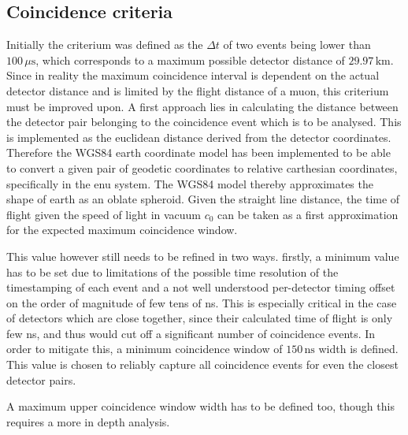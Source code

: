 \documentclass[abstract,toc,los,english,10pt,glossary,acronyms]{jluthesis}
\begin{document}
\subsection{Coincidence criteria}
\begin{figure}[ht!]
	\centering
\end{figure}
Initially the criterium was defined as the $\Delta{t}$ of two events being lower than $100\,\mu\text{s}$, which corresponds to a maximum possible detector distance of $29.97\,\text{km}$. Since in reality the maximum coincidence interval is dependent on the actual detector distance and is limited by the flight distance of a muon, this criterium must be improved upon. A first approach lies in calculating the distance between the detector pair belonging to the coincidence event which is to be analysed. This is implemented as the euclidean distance derived from the detector coordinates. Therefore the WGS84 earth coordinate model has been implemented to be able to convert a given pair of geodetic coordinates to relative carthesian coordinates, specifically in the \acrfull{enu} system. The WGS84 model thereby approximates the shape of earth as an oblate spheroid. Given the straight line distance, the time of flight given the speed of light in vacuum $c_0$ can be taken as a first approximation for the expected maximum coincidence window.

This value however still needs to be refined in two ways. firstly, a minimum value has to be set due to limitations of the possible time resolution of the timestamping of each event and a not well understood per-detector timing offset on the order of magnitude of few tens of ns. This is especially critical in the case of detectors which are close together, since their calculated time of flight is only few ns, and thus would cut off a significant number of coincidence events. In order to mitigate this, a minimum coincidence window of $150\,\text{ns}$ width is defined. This value is chosen to reliably capture all coincidence events for even the closest detector pairs.

A maximum upper coincidence window width has to be defined too, though this requires a more in depth analysis. 
\end{document}
